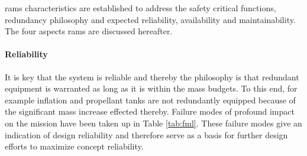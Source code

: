 \acrfull{rams} characteristics are established to address the safety critical functions, redundancy philosophy and expected reliability, availability and maintainability. The four aspects \gls{rams} are discussed hereafter.

\paragraph{Reliability}
It is key that the system is reliable and thereby the philosophy is that redundant equipment is warranted as long as it is within the mass budgets. To this end, for example inflation and propellant tanks are not redundantly equipped because of the significant mass increase effected thereby. Failure modes of profound impact on the mission have been taken up in Table \ref{tab:fml}. These failure modes give an indication of design reliability and therefore serve as a basis for further design efforts to maximize concept reliability.

